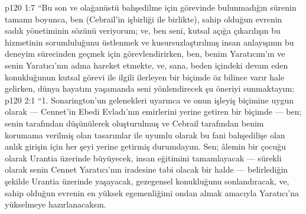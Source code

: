 \vs p120 1:7 “Bu son ve olağanüstü bahşedilme için görevinde bulunmadığın sürenin tamamı boyunca, ben (Cebrail’in işbirliği ile birlikte), sahip olduğun evrenin sadık yönetiminin sözünü veriyorum; ve, ben seni, kutsal açığa çıkarılışın bu hizmetinin sorumluluğunu üstlenmek ve kusursuzlaştırılmış insan anlayışının bu deneyim sürecinden geçmek için görevlendirirken, ben, benim Yaratıcım’ın ve senin Yaratıcı’nın adına hareket etmekte, ve, sana, beden içindeki devam eden konukluğunun kutsal görevi ile ilgili ilerleyen bir biçimde öz bilince varır hale gelirken, dünya hayatını yaşamanda seni yönlendirecek şu öneriyi sunmaktayım:
\vs p120 2:1 “1. Sonarington’un gelenekleri uyarınca ve onun işleyiş biçimine uygun olarak --- Cennet’in Ebedi Evladı’nın emirlerini yerine getiren bir biçimde --- ben; senin tarafından düşünülerek oluşturulmuş ve Cebrail tarafından benim korumama verilmiş olan tasarımlar ile uyumlu olarak bu fani bahşedilişe olan anlık girişin için her şeyi yerine getirmiş durumdayım. Sen; âlemin bir çocuğu olarak Urantia üzerinde büyüyecek, insan eğitimini tamamlayacak --- sürekli olarak senin Cennet Yaratıcı’nın iradesine tabi olacak bir halde --- belirlediğin şekilde Urantia üzerinde yaşayacak, gezegensel konukluğunu sonlandıracak, ve, sahip olduğun evrenin en yüksek egemenliğimi ondan almak amacıyla Yaratıcı’na yükselmeye hazırlanacaksın.
